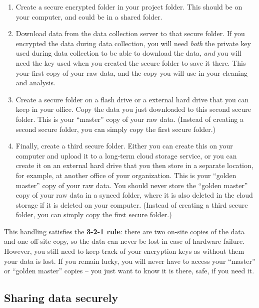 \begin{enumerate}
	\item Create a secure encrypted folder in your project folder.
  This should be on your computer, and could be in a shared folder.
	\item Download data from the data collection server to that secure folder.
	If you encrypted the data during data collection, you will need \textit{both} the
	private key used during data collection to be able to download the data,
	\textit{and} you will need the key used when you created the secure folder to save it there.
	This your first copy of your raw data, and the copy you will use in your cleaning and analysis.
	\item Create a secure folder on a flash drive or a external hard drive that you can keep in your office.
	Copy the data you just downloaded to this second secure	folder.
	This is your ``master'' copy of your raw data.
	(Instead of creating a second secure folder, you can simply copy the first secure folder.)
	\item Finally, create a third secure folder.
	Either you can create this on your computer and upload it to a long-term cloud storage service,
	or you can create it on	an external hard drive that you then store in a separate location,
	for example, at another office of your organization.
	This is your ``golden master'' copy of your raw	data.
	You should never store the ``golden master'' copy of your raw data in a synced
	folder, where it is also deleted in the cloud storage if it is deleted on your computer.
	(Instead of creating a third secure folder, you can simply copy the first secure folder.)
\end{enumerate}

\noindent This handling satisfies the \textbf{3-2-1 rule}:
there are two on-site copies of the data and one off-site copy,
so the data can never be lost in case of hardware failure.
However, you still need to keep track of your encryption keys as without them your data is lost.
If you remain lucky, you will never have to access your ``master'' or ``golden master'' copies --
you just want to know it is there, safe, if you need it.

\subsection{Sharing data securely}

